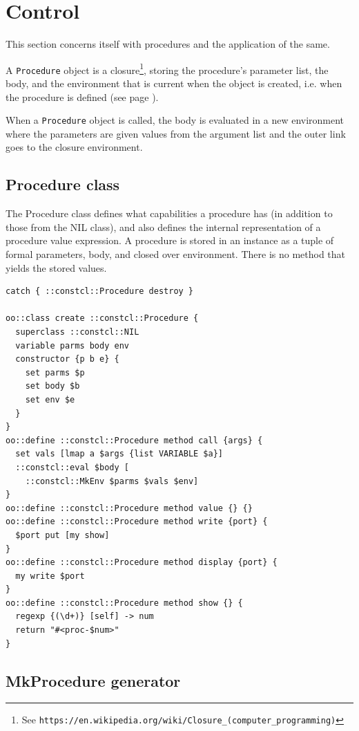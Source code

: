 \documentclass[twoside]{report}
\begin{document}
\section{Control}
\label{control}

This section concerns itself with procedures and the application of the same.

A \texttt{Procedure} object is a closure\footnote{See \texttt{https://en.wikipedia.org/wiki/Closure\_(computer\_programming)}}, storing the procedure's parameter list, the body, and the environment that is current when the object is created, i.e. when the procedure is defined (see page \pageref{procedure-definition}).

When a \texttt{Procedure} object is called, the body is evaluated in a new environment where the parameters are given values from the argument list and the outer link goes to the closure environment.

\subsection{Procedure class}
\label{procedure-class}

The Procedure class defines what capabilities a procedure has (in addition to those from the NIL class), and also defines the internal representation of a procedure value expression. A procedure is stored in an instance as a tuple of formal parameters, body, and closed over environment. There is no method that yields the stored values.

\begin{lstlisting}
catch { ::constcl::Procedure destroy }

oo::class create ::constcl::Procedure {
  superclass ::constcl::NIL
  variable parms body env
  constructor {p b e} {
    set parms $p
    set body $b
    set env $e
  }
}
oo::define ::constcl::Procedure method call {args} {
  set vals [lmap a $args {list VARIABLE $a}]
  ::constcl::eval $body [
    ::constcl::MkEnv $parms $vals $env]
}
oo::define ::constcl::Procedure method value {} {}
oo::define ::constcl::Procedure method write {port} {
  $port put [my show]
}
oo::define ::constcl::Procedure method display {port} {
  my write $port
}
oo::define ::constcl::Procedure method show {} {
  regexp {(\d+)} [self] -> num
  return "#<proc-$num>"
}
\end{lstlisting}

\subsection{MkProcedure generator}
\label{mkprocedure-generator}
\end{document}

